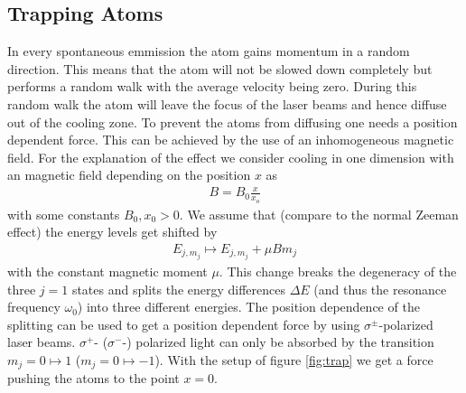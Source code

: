 \subsection{Trapping Atoms}
In every spontaneous emmission the atom gains momentum in a random direction. This means that the atom will not be slowed down completely but performs a random walk with the average velocity being zero. During this random walk the atom will leave the focus of the laser beams and hence diffuse out of the cooling zone. To prevent the atoms from diffusing one needs a position dependent force. This can be achieved by the use of an inhomogeneous magnetic field. For the explanation of the effect we consider cooling in one dimension with an magnetic field depending on the position $x$ as
\begin{align*}
  B=B_0 \frac{x}{x_o}
\end{align*}
with some constants $B_0,x_0>0$. We assume that (compare to the normal Zeeman effect) the energy levels get shifted by 
\begin{align*}
  E_{j,m_j} \mapsto E_{j,m_j}+\mu B m_j
\end{align*}
with the constant magnetic moment $\mu$. This change breaks the degeneracy of the three $j=1$ states and splits the energy differences $\Delta E$ (and thus the resonance frequency $\omega_0$) into three different energies. The position dependence of the splitting can be used to get a position dependent force by using $\sigma^\pm$-polarized laser beams. $\sigma^+$- ($\sigma^-$-) polarized light can only be absorbed by the transition $m_j=0 \mapsto 1$ ($m_j=0 \mapsto -1$). With the setup of figure \ref{fig:trap} we get a force pushing the atoms to the point $x=0$.
